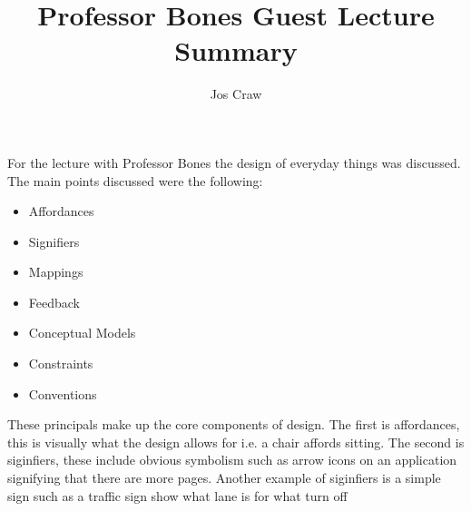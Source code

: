 \documentclass{article}
\title{Professor Bones Guest Lecture Summary}
\author{Jos Craw}
\begin{document}
\maketitle{}
For the lecture with Professor Bones the design of everyday things was discussed. The main points
discussed were the following:

\begin{itemize}
    \item{Affordances}
    \item{Signifiers}
    \item{Mappings}
    \item{Feedback}
    \item{Conceptual Models}
    \item{Constraints}
    \item{Conventions}
\end{itemize}

These principals make up the core components of design. The first is affordances, this is visually
what the design allows for i.e. a chair affords sitting. The second is siginfiers, these include
obvious symbolism such as arrow icons on an application signifying that there are more pages.
Another example of siginfiers is a simple sign such as a traffic sign show what lane is for what
turn off 
\end{document}
